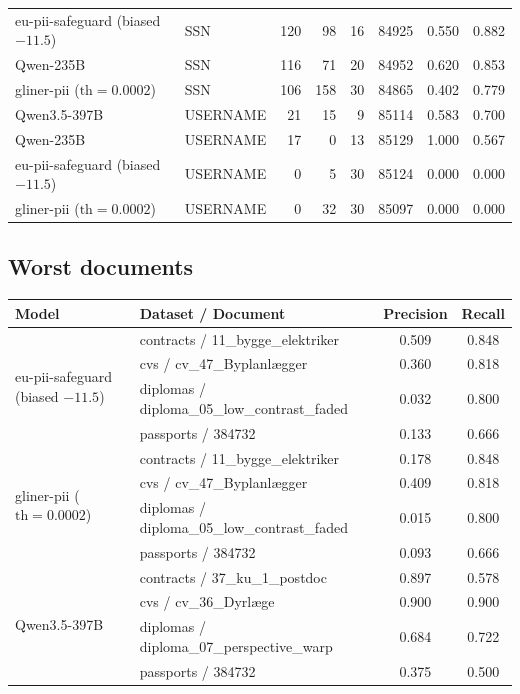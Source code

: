 \documentclass[11pt,a4paper]{article}
\begin{document}
{\begin{longtable}{llrrrrrr}
eu-pii-safeguard (biased $-11.5$) & SSN               &  120 &    98 &  16 & 84925 & 0.550 & 0.882 \\
Qwen-235B                         & SSN               &  116 &    71 &  20 & 84952 & 0.620 & 0.853 \\
gliner-pii ($\text{th}=0.0002$)   & SSN               &  106 &   158 &  30 & 84865 & 0.402 & 0.779 \\
\midrule
Qwen3.5-397B                      & USERNAME          &   21 &    15 &   9 & 85114 & 0.583 & 0.700 \\
Qwen-235B                         & USERNAME          &   17 &     0 &  13 & 85129 & 1.000 & 0.567 \\
eu-pii-safeguard (biased $-11.5$) & USERNAME          &    0 &     5 &  30 & 85124 & 0.000 & 0.000 \\
gliner-pii ($\text{th}=0.0002$)   & USERNAME          &    0 &    32 &  30 & 85097 & 0.000 & 0.000 \\
\end{longtable}
\par}

\subsection{Worst documents}

\begin{table}[H]
\centering
\small
\setlength{\tabcolsep}{4pt}
\begin{tabular}{llcc}
\toprule
\textbf{Model} & \textbf{Dataset / Document} & \textbf{Precision} & \textbf{Recall} \\
\midrule
\multirow{4}{*}{eu-pii-safeguard (biased $-11.5$)}
  & contracts / 11\_bygge\_elektriker            & 0.509 & 0.848 \\
  & cvs / cv\_47\_Byplanlægger                   & 0.360 & 0.818 \\
  & diplomas / diploma\_05\_low\_contrast\_faded & 0.032 & 0.800 \\
  & passports / 384732                           & 0.133 & 0.666 \\
\midrule
\multirow{4}{*}{gliner-pii ($\text{th}=0.0002$)}
  & contracts / 11\_bygge\_elektriker            & 0.178 & 0.848 \\
  & cvs / cv\_47\_Byplanlægger                   & 0.409 & 0.818 \\
  & diplomas / diploma\_05\_low\_contrast\_faded & 0.015 & 0.800 \\
  & passports / 384732                           & 0.093 & 0.666 \\
\midrule
\multirow{4}{*}{Qwen3.5-397B}
  & contracts / 37\_ku\_1\_postdoc               & 0.897 & 0.578 \\
  & cvs / cv\_36\_Dyrlæge                        & 0.900 & 0.900 \\
  & diplomas / diploma\_07\_perspective\_warp    & 0.684 & 0.722 \\
  & passports / 384732                           & 0.375 & 0.500 \\
\bottomrule
\end{tabular}
\end{table}
\end{document}

